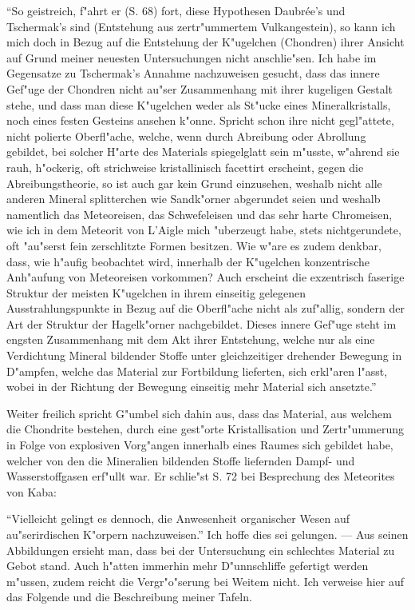 \documentclass[a4paper, 11pt, oneside]{article}
\begin{document}
"`So geistreich, f"ahrt er (S. 68) fort, diese Hypothesen Daubrée's und Tschermak's sind (Entstehung aus zertr"ummertem Vulkangestein), so kann ich mich doch in Bezug auf die Entstehung der K"ugelchen (Chondren) ihrer Ansicht auf Grund meiner neuesten Untersuchungen nicht anschlie"sen. Ich habe im Gegensatze zu Tschermak's Annahme nachzuweisen gesucht, dass das innere Gef"uge der Chondren nicht au"ser Zusammenhang mit ihrer kugeligen Gestalt stehe, und dass man diese K"ugelchen weder als St"ucke eines Mineralkristalls, noch eines festen Gesteins ansehen k"onne. Spricht schon ihre nicht gegl"attete, nicht polierte Oberfl"ache, welche, wenn durch Abreibung oder Abrollung gebildet, bei solcher H"arte des Materials spiegelglatt sein m"usste, w"ahrend sie rauh, h"ockerig, oft strichweise kristallinisch facettirt erscheint, gegen die Abreibungstheorie, so ist auch gar kein Grund einzusehen, weshalb nicht alle anderen Mineral splitterchen wie Sandk"orner abgerundet seien und weshalb namentlich das Meteoreisen, das Schwefeleisen und das sehr harte Chromeisen, wie ich in dem Meteorit von L'Aigle mich "uberzeugt habe, stets nichtgerundete, oft "au"serst fein zerschlitzte Formen besitzen. Wie w"are es zudem denkbar, dass, wie h"aufig beobachtet wird, innerhalb der K"ugelchen konzentrische Anh"aufung von Meteoreisen vorkommen? Auch erscheint die exzentrisch faserige Struktur der meisten K"ugelchen in ihrem einseitig gelegenen Ausstrahlungspunkte in Bezug auf die Oberfl"ache nicht als zuf"allig, sondern der Art der Struktur der Hagelk"orner nachgebildet. Dieses innere Gef"uge steht im engsten Zusammenhang mit dem Akt ihrer Entstehung, welche nur als eine Verdichtung Mineral bildender Stoffe unter gleichzeitiger drehender Bewegung in D"ampfen, welche das Material zur Fortbildung lieferten, sich erkl"aren l"asst, wobei in der Richtung der Bewegung einseitig mehr Material sich ansetzte."'

Weiter freilich spricht G"umbel sich dahin aus, dass das Material, aus welchem die Chondrite bestehen, durch eine gest"orte Kristallisation und Zertr"ummerung in Folge von explosiven Vorg"angen innerhalb eines Raumes sich gebildet habe, welcher von den die Mineralien bildenden Stoffe liefernden Dampf- und Wasserstoffgasen erf"ullt war. Er schlie"st S. 72 bei Besprechung des Meteorites von Kaba:

"`Vielleicht gelingt es dennoch, die Anwesenheit organischer Wesen auf au"serirdischen K"orpern nachzuweisen."' Ich hoffe dies sei gelungen. --- Aus seinen Abbildungen ersieht man, dass bei der Untersuchung ein schlechtes Material zu Gebot stand. Auch h"atten immerhin mehr D"unnschliffe gefertigt werden m"ussen, zudem reicht die Vergr"o"serung bei Weitem nicht. Ich verweise hier auf das Folgende und die Beschreibung meiner Tafeln.
\end{document}
